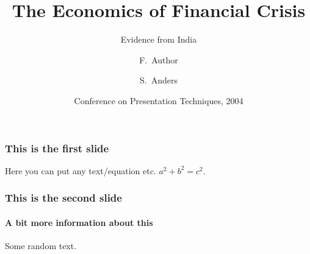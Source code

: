 \documentclass{beamer}
\title[Crisis] %
	{The Economics of Financial Crisis}
\subtitle{Evidence from India}
\author[Author, Anders] %
	{F.~Author\inst{1} \and S.~Anders\inst{2}}
\institute[Universities Here and There] %
	{ \inst{1} Institute of Computer Science\newline
	  University Here
	  \and
	  \inst{2}%
	  Institute of Theoretical Philosophy\newline
	  University There 	}
\date[KPT 2004] %
	{Conference on Presentation Techniques, 2004}
\begin{document}
     \maketitle
	\begin{frame}
		\frametitle{This is the first slide}
		Here you can put any text/equation etc. 
		$a^2 + b^2 = c^2$.		
	\end{frame}
	\begin{frame}
		\frametitle{This is the second slide}
		\framesubtitle{A bit more information about this}
		Some random text.		
	\end{frame}
\end{document}
